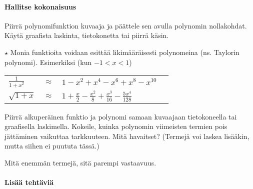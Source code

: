 \begin{tehtavasivu}
\paragraph*{Hallitse kokonaisuus}

\begin{tehtava}
Piirrä polynomifunktion kuvaaja ja päättele sen avulla polynomin nollakohdat.
Käytä graafista laskinta, tietokonetta tai piirrä käsin.
\begin{alakohdat}
\end{alakohdat}
\begin{vastaus}
\begin{alakohdat}
\end{alakohdat}
\end{vastaus}
\end{tehtava}

\begin{tehtava} $\star$
	Monia funktioita voidaan esittää likimääräisesti polynomeina (ns.
Taylorin polynomi). Esimerkiksi (kun $-1<x<1$)

	\begin{tabular}{lcll}
	$\frac{1}{1+x^2}$ &$\approx$ & $1-x^2+x^4-x^6+x^8-x^{10}$ \\
	$\sqrt{1+x}$ & $\approx $ & $ 1+\frac{x}{2}
	-\frac{x^2}{8}+\frac{x^3}{16}-\frac{5x^4}{128}$
	\end{tabular}

	Piirrä alkuperäinen funktio ja polynomi samaan kuvaajaan tietokoneella
tai graafisella laskimella. Kokeile, kuinka polynomin viimeisten termien pois
jättäminen vaikuttaa tarkkuuteen. Mitä havaitset? (Termejä voi laskea lisääkin,
mutta siihen ei puututa tässä.)

	\begin{vastaus}
		Mitä enemmän termejä, sitä parempi vastaavuus.
	\end{vastaus}
\end{tehtava}

\paragraph*{Lisää tehtäviä}


\end{tehtavasivu}
